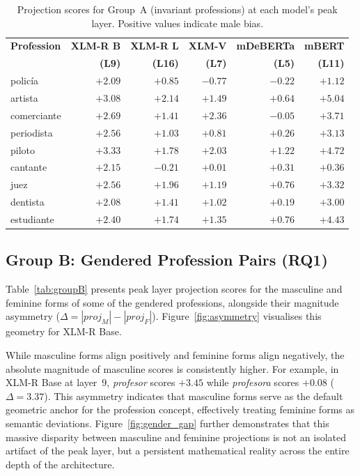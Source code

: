 \documentclass[english, a4paper, 11.5pt, twoside]{article}
\begin{document}
\begin{table}[!htbp]
\centering
\caption{Projection scores for Group~A (invariant professions) at each model's peak layer. Positive values indicate male bias.}
\label{tab:groupA}
\small
\begin{tabular}{lrrrrr}
\toprule
\textbf{Profession} & \textbf{XLM-R B} & \textbf{XLM-R L} & \textbf{XLM-V} & \textbf{mDeBERTa} & \textbf{mBERT} \\
 & \textbf{(L9)} & \textbf{(L16)} & \textbf{(L7)} & \textbf{(L5)} & \textbf{(L11)} \\
\midrule
policía       & $+2.09$ & $+0.85$ & $-0.77$ & $-0.22$ & $+1.12$ \\
artista       & $+3.08$ & $+2.14$ & $+1.49$ & $+0.64$ & $+5.04$ \\
comerciante   & $+2.69$ & $+1.41$ & $+2.36$ & $-0.05$ & $+3.71$ \\
periodista    & $+2.56$ & $+1.03$ & $+0.81$ & $+0.26$ & $+3.13$ \\
piloto        & $+3.33$ & $+1.78$ & $+2.03$ & $+1.22$ & $+4.72$ \\
cantante      & $+2.15$ & $-0.21$ & $+0.01$ & $+0.31$ & $+0.36$ \\
juez          & $+2.56$ & $+1.96$ & $+1.19$ & $+0.76$ & $+3.32$ \\
dentista      & $+2.08$ & $+1.41$ & $+1.02$ & $+0.19$ & $+3.00$ \\
estudiante    & $+2.40$ & $+1.74$ & $+1.35$ & $+0.76$ & $+4.43$ \\
\bottomrule
\end{tabular}
\end{table}


\subsection{Group B: Gendered Profession Pairs (RQ1)}\label{subsec:groupB}

Table~\ref{tab:groupB} presents peak layer projection scores for the masculine and feminine forms of some of the gendered professions, alongside their magnitude asymmetry ($\Delta = |proj_M| - |proj_F|$). Figure~\ref{fig:asymmetry} visualises this geometry for XLM-R Base.

While masculine forms align positively and feminine forms align negatively, the absolute magnitude of masculine scores is consistently higher. For example, in XLM-R Base at layer~9, \textit{profesor} scores $+3.45$ while \textit{profesora} scores $+0.08$ ($\Delta = 3.37$). This asymmetry indicates that masculine forms serve as the default geometric anchor for the profession concept, effectively treating feminine forms as semantic deviations. Figure~\ref{fig:gender_gap} further demonstrates that this massive disparity between masculine and feminine projections is not an isolated artifact of the peak layer, but a persistent mathematical reality across the entire depth of the architecture.
\end{document}
